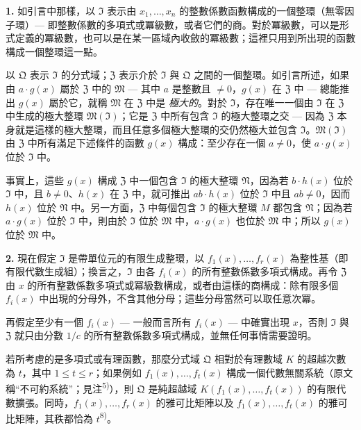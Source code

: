 \documentclass[11pt]{article}
\begin{document}
\noindent\textbf{1.}
如引言中那樣，以 $\mathfrak{I}$ 表示由 $x_1,\ldots,x_n$ 的整數係數函數構成的一個整環（無零因子環）--- 即整數係數的多項式或冪級數，或者它們的商。對於冪級數，可以是形式定義的冪級數，也可以是在某一區域內收斂的冪級數；這裡只用到所出現的函數構成一個整環這一點。

以 $\mathfrak{Q}$ 表示 $\mathfrak{I}$ 的分式域；$\mathfrak{Z}$ 表示介於 $\mathfrak{I}$ 與 $\mathfrak{Q}$ 之間的一個整環。如引言所述，如果由 $a \cdot g(x)$ 屬於 $\mathfrak{Z}$ 中的 $\mathfrak{M}$ --- 其中 $a$ 是整數且 $\neq 0$，$g(x)$ 在 $\mathfrak{Z}$ 中 --- 總能推出 $g(x)$ 屬於它，就稱 $\mathfrak{M}$ 在 $\mathfrak{Z}$ 中是 \textit{極大的}。對於 $\mathfrak{I}$，存在唯一一個由 $\mathfrak{I}$ 在 $\mathfrak{Z}$ 中生成的極大整環 $\mathfrak{M}(\mathfrak{I})$；它是 $\mathfrak{Z}$ 中所有包含 $\mathfrak{I}$ 的極大整環之交 --- 因為 $\mathfrak{Z}$ 本身就是這樣的極大整環，而且任意多個極大整環的交仍然極大並包含 $\mathfrak{I}$。$\mathfrak{M}(\mathfrak{I})$ 由 $\mathfrak{Z}$ 中所有滿足下述條件的函數 $g(x)$ 構成：至少存在一個 $a \neq 0$，使 $a \cdot g(x)$ 位於 $\mathfrak{I}$ 中。

事實上，這些 $g(x)$ 構成 $\mathfrak{Z}$ 中一個包含 $\mathfrak{I}$ 的極大整環 $\mathfrak{N}$，因為若 $b \cdot h(x)$ 位於 $\mathfrak{I}$ 中，且 $b \neq 0$、$h(x)$ 在 $\mathfrak{Z}$ 中，就可推出 $ab \cdot h(x)$ 位於 $\mathfrak{I}$ 中且 $ab \neq 0$，因而 $h(x)$ 位於 $\mathfrak{N}$ 中。另一方面，$\mathfrak{Z}$ 中每個包含 $\mathfrak{I}$ 的極大整環 $M$ 都包含 $\mathfrak{N}$；因為若 $a \cdot g(x)$ 位於 $\mathfrak{I}$ 中，則由於 $\mathfrak{I}$ 位於 $\mathfrak{M}$ 中，$a \cdot g(x)$ 也位於 $\mathfrak{M}$ 中；所以 $g(x)$ 位於 $\mathfrak{M}$ 中。

\medskip\noindent\textbf{2.}
現在假定 $\mathfrak{I}$ 是帶單位元的有限生成整環，以 $f_1(x),\ldots,f_r(x)$ 為整性基（即有限代數生成組）；換言之，$\mathfrak{I}$ 由各 $f_i(x)$ 的所有整數係數多項式構成。再令 $\mathfrak{Z}$ 由 $x$ 的所有整數係數多項式或冪級數構成，或者由這樣的商構成：除有限多個 $f_i(x)$ 中出現的分母外，不含其他分母；這些分母當然可以取任意次冪。

再假定至少有一個 $f_i(x)$ --- 一般而言所有 $f_i(x)$ --- 中確實出現 $x$，否則 $\mathfrak{I}$ 與 $\mathfrak{Z}$ 就只由分數 $1/c$ 的所有整數係數多項式構成，並無任何事情需要證明。

若所考慮的是多項式或有理函數，那麼分式域 $\mathfrak{Q}$ 相對於有理數域 $K$ 的超越次數為 $t$，其中 $1 \leq t \leq r$；如果例如 $f_1(x),\ldots,f_t(x)$ 構成一個代數無關系統（原文稱“不可約系統”；見注\textsuperscript{5)}），則 $\mathfrak{Q}$ 是純超越域 $K(f_1(x),\ldots,f_t(x))$ 的有限代數擴張。同時，$f_1(x),\ldots,f_r(x)$ 的雅可比矩陣以及 $f_1(x),\ldots,f_t(x)$ 的雅可比矩陣，其秩都恰為 $t$\textsuperscript{8)}。
\end{document}
